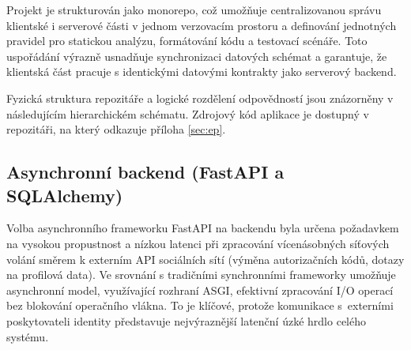\documentclass[male,czech,api_bc]{kitheses}
\begin{document}
Projekt je strukturován jako monorepo, což umožňuje centralizovanou správu klientské i serverové části v jednom verzovacím prostoru a definování jednotných pravidel pro statickou analýzu, formátování kódu a testovací scénáře. Toto uspořádání výrazně usnadňuje synchronizaci datových schémat a garantuje, že klientská část pracuje s identickými datovými kontrakty jako serverový backend.

Fyzická struktura repozitáře a logické rozdělení odpovědností jsou znázorněny v následujícím hierarchickém schématu. Zdrojový kód aplikace je dostupný v repozitáři, na který odkazuje příloha \vref{sec:ep}.
 
\begin{minipage}{\linewidth}
\end{minipage}
\label{struktura_repozitare}

\subsection{Asynchronní backend (FastAPI a SQLAlchemy)}

Volba asynchronního frameworku FastAPI na backendu byla určena požadavkem na vysokou propustnost a nízkou latenci při zpracování vícenásobných síťových volání směrem k externím API sociálních sítí (výměna autorizačních kódů, dotazy na profilová data). Ve srovnání s tradičními synchronními frameworky umožňuje asynchronní model, využívající rozhraní ASGI, efektivní zpracování I/O operací bez blokování operačního vlákna. To je klíčové, protože komunikace s~externími poskytovateli identity představuje nejvýraznější latenční úzké hrdlo celého systému.
\end{document}
